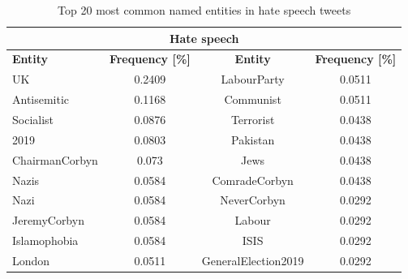 \documentclass[conference]{IEEEtran}
\begin{document}
\begin{table}[!ht]
  \def\arraystretch{1.2}%
  \begin{center}
    \caption{Top 20 most common named entities in hate speech tweets}
    \label{tab:named_entities_hate}
    \begin{tabular}{l c | c c}
      \hline\hline
      \multicolumn{4}{c}{\textbf{Hate speech}}\\
      \hline
      \textbf{Entity}&\textbf{Frequency [\%]}&\textbf{Entity}&\textbf{Frequency [\%]}\\
      \hline
      UK & 0.2409 & LabourParty & 0.0511\\
      Antisemitic & 0.1168 & Communist & 0.0511\\
      Socialist & 0.0876 & Terrorist & 0.0438\\
      2019 & 0.0803 & Pakistan & 0.0438\\
      ChairmanCorbyn & 0.073 & Jews & 0.0438\\
      Nazis & 0.0584 & ComradeCorbyn & 0.0438\\
      Nazi & 0.0584 & NeverCorbyn & 0.0292\\
      JeremyCorbyn & 0.0584 & Labour & 0.0292\\
      Islamophobia & 0.0584 & ISIS & 0.0292\\
      London & 0.0511 & GeneralElection2019 & 0.0292\\                        
      \hline\hline
    \end{tabular}  
  \end{center}
\end{table}
\end{document}

